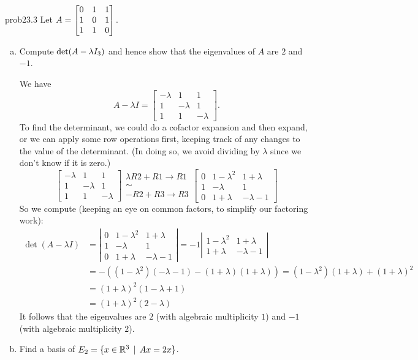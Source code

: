 \begin{sol}{prob23.3} Let $A=\bmatrix
0&1&1\\ 1&0&1\\ 1&1&0 \endbmatrix$. 

\begin{enumerate}[a)]

\item Compute $\det(A-\lambda I_3)$ and hence show that the eigenvalues of
$A$ are $2$ and $-1$.

\soln  We have
$$
A-\lambda I = \begin{bmatrix}
-\lambda &1&1\\ 1&-\lambda &1\\ 1&1&-\lambda \end{bmatrix}.
$$
To find the determinant, we could do a cofactor expansion and then expand, or we can apply some row operations first, keeping track of any changes to the value of the determinant.  (In doing so, we avoid dividing by $\lambda$ since we don't know if it is zero.)
$$
\begin{bmatrix}
-\lambda &1&1\\ 
1&-\lambda &1\\ 
1&1&-\lambda \end{bmatrix} \begin{matrix} \lambda R2+R1 \to R1\\ \sim \\ -R2+R3 \to R3\end{matrix}
\begin{bmatrix}
0 &1-\lambda^2&1+\lambda\\ 
1&-\lambda &1\\ 
0&1+\lambda&-\lambda-1 \end{bmatrix} 
$$
So we compute (keeping an eye on common factors, to simplify our factoring work):
\begin{align*}
\det( A-\lambda I)&= \left\vert \begin{matrix}
0 &1-\lambda^2&1+\lambda\\ 
1&-\lambda &1\\ 
0&1+\lambda&-\lambda-1 \end{matrix}\right| = -1\left|\begin{matrix}1-\lambda^2 & 1+\lambda \\ 1 + \lambda & -\lambda - 1\end{matrix}\right|\\
&= -((1-\lambda^2)(-\lambda - 1) - (1+\lambda)(1+\lambda)) = (1-\lambda^2)(1+\lambda) + (1+\lambda)^2\\
&= (1+\lambda)^2( 1-\lambda+1) \\
&= (1+\lambda)^2(2-\lambda)
\end{align*}
It follows that the eigenvalues are $2$ (with algebraic multiplicity $1$) and $-1$ (with algebraic multiplicity $2$).
\item Find a basis of $E_2 =\{x\in \mathbb{R}^3 \,\mid \, Ax= 2x \}$.


\end{enumerate}
\end{sol}
